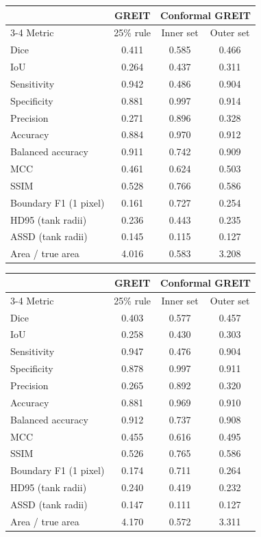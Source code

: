 \begin{tabular}{lccc}
\toprule
 & GREIT & \multicolumn{2}{c}{Conformal GREIT}\\
\cmidrule(lr){3-4}
Metric & 25\% rule & Inner set & Outer set\\
\midrule
Dice & 0.411 & 0.585 & 0.466\\
IoU & 0.264 & 0.437 & 0.311\\
Sensitivity & 0.942 & 0.486 & 0.904\\
Specificity & 0.881 & 0.997 & 0.914\\
Precision & 0.271 & 0.896 & 0.328\\
Accuracy & 0.884 & 0.970 & 0.912\\
Balanced accuracy & 0.911 & 0.742 & 0.909\\
MCC & 0.461 & 0.624 & 0.503\\
SSIM & 0.528 & 0.766 & 0.586\\
Boundary F1 (1 pixel) & 0.161 & 0.727 & 0.254\\
HD95 (tank radii) & 0.236 & 0.443 & 0.235\\
ASSD (tank radii) & 0.145 & 0.115 & 0.127\\
Area / true area & 4.016 & 0.583 & 3.208\\
\bottomrule
\end{tabular}

\begin{tabular}{lccc}
\toprule
 & GREIT & \multicolumn{2}{c}{Conformal GREIT}\\
\cmidrule(lr){3-4}
Metric & 25\% rule & Inner set & Outer set\\
\midrule
Dice & 0.403 & 0.577 & 0.457\\
IoU & 0.258 & 0.430 & 0.303\\
Sensitivity & 0.947 & 0.476 & 0.904\\
Specificity & 0.878 & 0.997 & 0.911\\
Precision & 0.265 & 0.892 & 0.320\\
Accuracy & 0.881 & 0.969 & 0.910\\
Balanced accuracy & 0.912 & 0.737 & 0.908\\
MCC & 0.455 & 0.616 & 0.495\\
SSIM & 0.526 & 0.765 & 0.586\\
Boundary F1 (1 pixel) & 0.174 & 0.711 & 0.264\\
HD95 (tank radii) & 0.240 & 0.419 & 0.232\\
ASSD (tank radii) & 0.147 & 0.111 & 0.127\\
Area / true area & 4.170 & 0.572 & 3.311\\
\bottomrule
\end{tabular}

